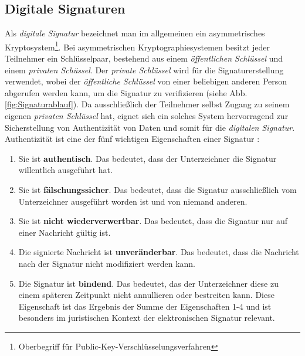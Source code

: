 \documentclass[11pt,a4paper,ngerman]{scrreprt}
\begin{document}
\subsection{Digitale Signaturen}\label{sec:signatur}
Als \textit{digitale Signatur} bezeichnet man im allgemeinen ein asymmetrisches Kryptosystem\footnote{Oberbegriff für Public-Key-Verschlüsselungsverfahren}. Bei asymmetrischen Kryptographiesystemen besitzt jeder Teilnehmer ein Schlüsselpaar, bestehend aus einem \emph{öffentlichen Schlüssel} und einem \emph{privaten Schüssel}. Der \emph{private Schlüssel} wird für die Signaturerstellung verwendet, wobei der \emph{öffentliche Schlüssel} von einer beliebigen anderen Person abgerufen werden kann, um die Signatur zu verifizieren (siehe Abb. \ref{fig:Signaturablauf}). Da ausschließlich der Teilnehmer selbst Zugang zu seinem eigenen \emph{privaten Schlüssel} hat, eignet sich ein solches System hervorragend zur Sicherstellung von Authentizität von Daten und somit für die \textit{digitalen Signatur}. Authentizität ist eine der fünf wichtigen Eigenschaften einer Signatur \cite{sch05}:
\begin{enumerate}
    \item Sie ist \textbf{authentisch}. Das bedeutet, dass der Unterzeichner die Signatur willentlich ausgeführt hat.
    \item Sie ist \textbf{fälschungssicher}. Das bedeutet, dass die Signatur ausschließlich vom Unterzeichner ausgeführt worden ist und von niemand anderen.
    \item Sie ist \textbf{nicht wiederverwertbar}. Das bedeutet, dass die Signatur nur auf einer Nachricht gültig ist.
    \item Die signierte Nachricht ist \textbf{unveränderbar}. Das bedeutet, dass die Nachricht nach der Signatur nicht modifiziert werden kann.
    \item Die Signatur ist \textbf{bindend}. Das bedeutet, das der Unterzeichner diese zu einem späteren Zeitpunkt nicht annullieren oder bestreiten kann. Diese Eigenschaft ist das Ergebnis der Summe der Eigenschaften 1-4 und ist besonders im juristischen Kontext der elektronischen Signatur relevant.
\end{enumerate}
\end{document}
